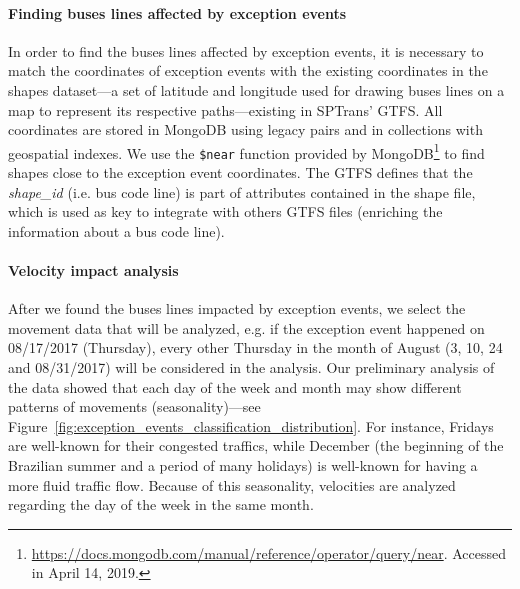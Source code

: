 \documentclass[runningheads]{llncs}
\begin{document}

\paragraph{\textbf{Finding buses lines affected by exception events}}

In order to find the buses lines affected by exception events, it is necessary to match the coordinates of exception events with the existing coordinates in the shapes dataset---a set of latitude and longitude used for drawing buses lines on a map to represent its respective paths---existing in SPTrans' GTFS. All coordinates are stored in MongoDB using legacy pairs and in collections with geospatial indexes. We use the \texttt{\$near} function provided by MongoDB\footnote{\url{https://docs.mongodb.com/manual/reference/operator/query/near}. Accessed in April 14, 2019.} to find shapes close to the exception event coordinates. The GTFS defines that the \textit{shape\_id} (i.e. bus code line) is part of attributes contained in the shape file, which is used as key to integrate with others GTFS files (enriching the information about a bus code line).

\paragraph{\textbf{Velocity impact analysis}}

After we found the buses lines impacted by exception events, we select the movement data that will be analyzed, e.g. if the exception event happened on 08/17/2017 (Thursday), every other Thursday in the month of August (3, 10, 24 and 08/31/2017) will be considered in the analysis. Our preliminary analysis of the data showed that each day of the week and month may show different patterns of movements (seasonality)---see Figure~\ref{fig:exception_events_classification_distribution}. For instance, Fridays are well-known for their congested traffics, while December (the beginning of the Brazilian summer and a period of many holidays) is well-known for having a more fluid traffic flow. Because of this seasonality, velocities are analyzed regarding the day of the week in the same month.
\end{document}
